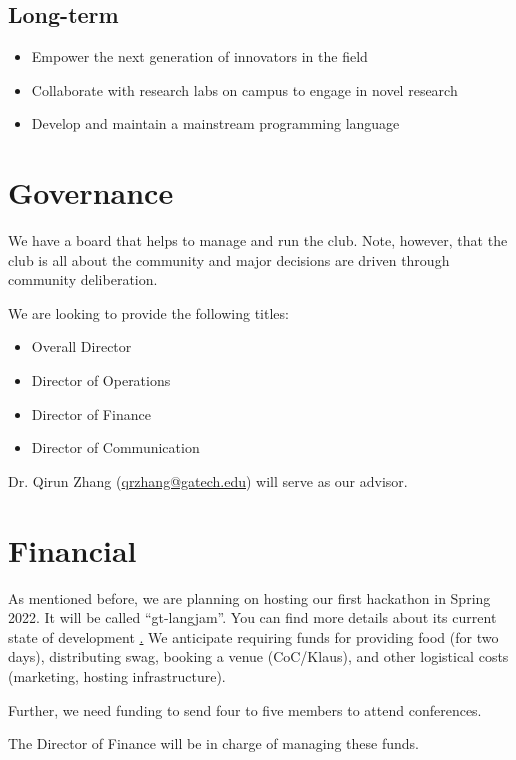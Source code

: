 \documentclass[12pt]{article}
\begin{document}
\subsection{Long-term}

\begin{itemize}
\item Empower the next generation of innovators in the field
\item Collaborate with research labs on campus to engage in novel research
\item Develop and maintain a mainstream programming language
\end{itemize}


\section{Governance} \label{sec:governance}
We have a board that helps to manage and run the club. Note, however, that the club is all about the community and major decisions are driven through community deliberation.

We are looking to provide the following titles:
\begin{itemize}
\item Overall Director
\item Director of Operations
\item Director of Finance
\item Director of Communication
\end{itemize}

Dr. Qirun Zhang (\href{mailto://qrzhang@gatech.edu}{qrzhang@gatech.edu}) will serve as our advisor.

\section{Financial} \label{sec:financial}

As mentioned before, we are planning on hosting our first hackathon in Spring 2022. It will be called ``gt-langjam''. You can find more details about its current state of development \href{https://dtyped-wiki.netlify.app/meetings/langjam\_and\_project\_ideas/}. We anticipate requiring funds for providing food (for two days), distributing swag, booking a venue (CoC/Klaus), and other logistical costs (marketing, hosting infrastructure).

Further, we need funding to send four to five members to attend conferences.

The Director of Finance will be in charge of managing these funds.
\end{document}
